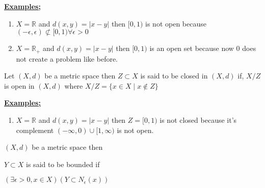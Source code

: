 \documentclass[12pt,a4paper]{article}
\begin{document}
\underline{\textbf{Examples;}}
\begin{enumerate}
    \item \(X=\mathbb{R}\) and \(d(x,y)=|x-y|\) then \([0,1)\) is not open because \((-\epsilon,\epsilon) \not\subset [0,1) \forall \epsilon > 0\)  
    \item \(X=\mathbb{R}_{+}\) and \(d(x,y)=|x-y|\) then \([0,1)\) is an open set because now \(0\) does not create a problem like before.       
\end{enumerate}

Let \((X,d)\) be a metric space then \( Z \subset X\) is said to be closed in \((X,d)\) if, \(X/Z\) is open in \((X,d)\) where \(X/Z = \{ x \in X \mid x \notin Z\}\)

\textbf{\underline{Examples;}}
\begin{enumerate}
    \item \(X=\mathbb{R}\) and \(d(x,y)=|x-y|\) then \(Z=[0,1) \) is not closed because it's complement \((-\infty, 0) \cup [1, \infty)\) is not open.        
\end{enumerate}
    
\((X, d)\) be a metric space then

\(Y \subset X\) is said to be bounded if

 \((\exists \epsilon>0, x \in X)\left(Y \subset N_\epsilon(x)\right)\)

    
\end{document}
